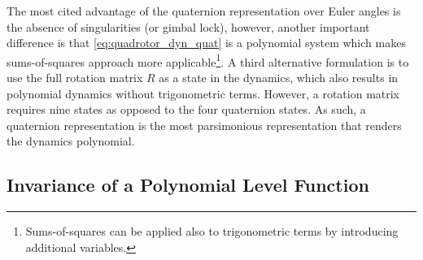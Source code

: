\documentclass[conference]{IEEEtran}
\begin{document}
The most cited advantage of the quaternion representation over Euler angles is the absence of singularities (or gimbal lock), however, another important difference is that \eqref{eq:quadrotor_dyn_quat} is a polynomial system which makes sums-of-squares approach more applicable\footnote{Sums-of-squares can be applied also to trigonometric terms by introducing additional variables.}. A third alternative formulation is to use the full rotation matrix $R$ as a state in the dynamics, which also results in polynomial dynamics without trigonometric terms. However, a rotation matrix requires nine states as opposed to the four quaternion states. As such, a quaternion representation is the most parsimonious representation that renders the dynamics polynomial.

\subsection{Invariance of a Polynomial Level Function}
\end{document}
